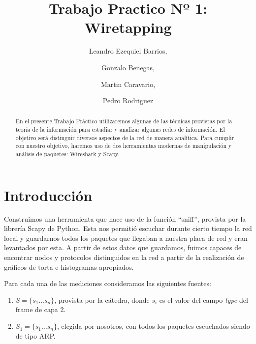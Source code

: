 \documentclass[final,narroweqnarray,inline]{ieee}
\begin{document}
\title[Trabajo Practico Nº 1: Wiretapping]{%
       Trabajo Practico Nº 1: Wiretapping}

\author[SHORT NAMES]{%
	Leandro Ezequiel Barrios,
	\and
	Gonzalo Benegas,
	\and
	Martin Caravario, 
	\and
	Pedro Rodriguez 
}

\maketitle               

\begin{abstract}
En el presente Trabajo Práctico utilizaremos algunas de las técnicas
provistas por la teoría de la información para estudiar y analizar algunas
redes de información. El objetivo será distinguir diversos aspectos de la
red de manera analítica. Para cumplir con nuestro objetivo, haremos uso de
dos herramientas modernas de manipulación y análisis de paquetes: Wireshark
y Scapy.
\end{abstract}



%
\section{ Introducción }

Construimos una herramienta que hace uso de la
función ``sniff'', provista por la librería Scapy de Python. Esta nos permitió escuchar durante
cierto tiempo la red local y guardarnos todos los paquetes que llegaban a
nuestra placa de red y eran levantados por esta. A partir de estos datos
que guardamos, fuimos capaces de encontrar  nodos y protocolos
distinguidos en la red a partir de la realización de gráficos de torta e histogramas apropiados.

Para cada una de las mediciones consideramos las siguientes fuentes: 
\begin{enumerate}
  \item $S = \{s_{1} \dots s_{n}\}$, provista por la cátedra, donde $s_{i}$ es el valor del campo
        \emph{type} del frame de capa 2. 
  \item $S_{1} = \{s_{1} \dots s_{n}\} $, elegida por nosotros, con todos los paquetes escuchados 
        siendo de tipo ARP.
\end{enumerate}
\end{document}
